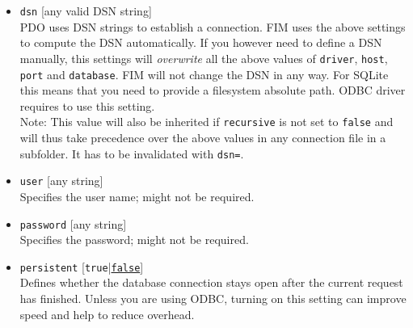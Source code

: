 \documentclass{scrartcl}
\begin{document}
\begin{itemize}
         \item \texttt{dsn} [any valid DSN string] \\
            PDO uses DSN strings to establish a connection. FIM uses the above settings to compute the DSN automatically. If you however need to define a DSN manually, this settings will \emph{overwrite} all the above values of \texttt{driver}, \texttt{host}, \texttt{port} and \texttt{database}. FIM will not change the DSN in any way. For SQLite this means that you need to provide a filesystem absolute path. ODBC driver requires to use this setting. \\
            Note: This value will also be inherited if \texttt{recursive} is not set to \texttt{false} and will thus take precedence over the above values in any connection file in a subfolder. It has to be invalidated with \texttt{dsn=}.
         \item \texttt{user} [any string] \\
            Specifies the user name; might not be required.
         \item \texttt{password} [any string] \\
            Specifies the password; might not be required.
         \item \texttt{persistent} [\texttt{true}|\underline{\texttt{false}}] \\
            Defines whether the database connection stays open after the current request has finished. Unless you are using ODBC, turning on this setting can improve speed and help to reduce overhead.
      \end{itemize}
\end{document}
